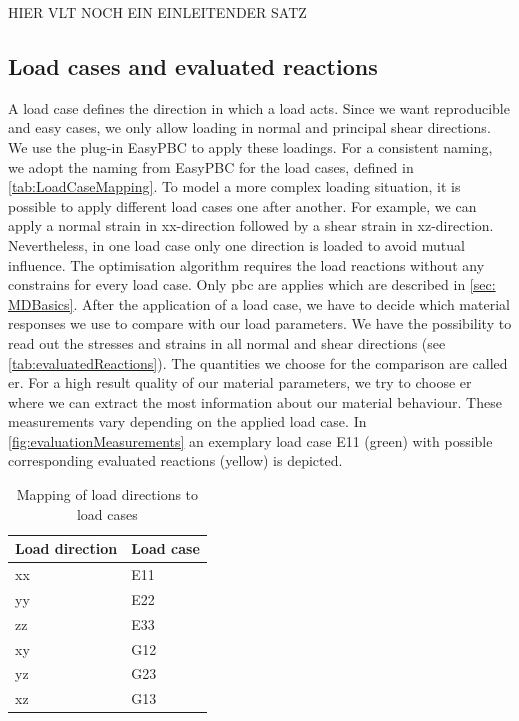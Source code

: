 


HIER VLT NOCH EIN EINLEITENDER SATZ

\subsection{Load cases and evaluated reactions}\label{subsec: loadCases}

A load case defines the direction in which a load acts. Since we want reproducible and easy cases, we only allow loading in normal and principal shear directions. We use the  plug-in EasyPBC to apply these loadings. For a consistent naming, we adopt the naming from EasyPBC for the load cases, defined in \autoref{tab:LoadCaseMapping}.
To model a more complex loading situation, it is possible to apply different load cases one after another. For example, we can apply a normal strain in xx-direction followed by a shear strain in xz-direction. Nevertheless, in one load case only one direction is loaded to avoid mutual influence. The optimisation algorithm requires the load reactions without any constrains for every load case. Only \acrshort{pbc} are applies which are described in \autoref{sec: MDBasics}. After the application of a load case, we have to decide which material responses we use to compare with our load parameters. We have the possibility to read out the stresses and strains in all normal and shear directions (see \autoref{tab:evaluatedReactions}). The quantities we choose for the comparison are called \acrlong{er}.
For a high result quality of our material parameters, we try to choose \acrlong{er} where we can extract the most information about our material behaviour. These measurements vary depending on the applied load case. In \autoref{fig:evaluationMeasurements} an exemplary load case E11 (green) with possible corresponding evaluated reactions (yellow) is depicted.

\begin{table}[h!] 
\centering
\caption{Mapping of load directions to load cases}
\label{tab:LoadCaseMapping}
\renewcommand{\arraystretch}{1.1}
\begin{tabular}{C{0.2\textwidth}C{0.15\textwidth}}
\toprule
\textbf{Load direction} & \textbf{Load case} \\ \midrule
xx & E11 \\ \hline
yy & E22 \\ \hline
zz & E33  \\ \hline
xy & G12 \\ \hline
yz & G23 \\ \hline
xz & G13 \\ \bottomrule
\end{tabular}
\end{table}

